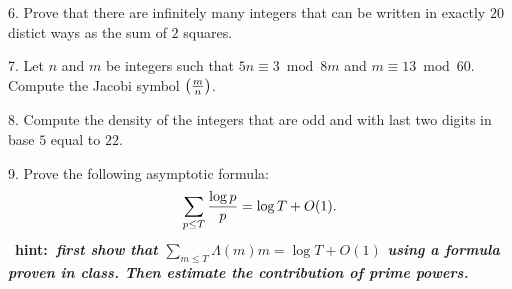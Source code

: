 \item{6.} Prove that there are infinitely many integers that can be written in exactly $20$ distict ways as the sum of $2$ squares.\vv
 
\item{7.} Let $n$ and $m$ be integers such that  $5n\equiv 3 \bmod 8m$ and $m\equiv13 \bmod 60$. Compute the Jacobi symbol $\left({m\over n}\right)$.
\ve\vs

\item{8.} Compute the density of the integers that are odd and with last two digits in base $5$ equal to $22$.\vv

\item{9.} Prove the following asymptotic formula:
$$\sum_{p\le T}{\log p\over p}=\log T + O(1).$$
{\ }\hskip 2cm\hfill{\bf hint:\it \ first show that $\sum_{m\le T}{\Lambda(m)}m=\log T + O(1)$ using a formula proven in class. 
Then estimate the contribution of prime powers.}
\ \vst\bye
